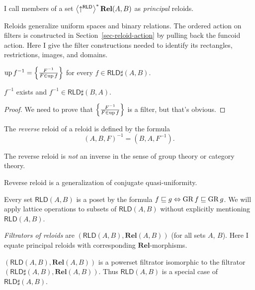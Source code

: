 \begin{defn}
I call members of a set $\left\langle \uparrow^{\mathsf{RLD}}\right\rangle ^{\ast}\mathbf{Rel}(A,B)$
as \emph{principal} reloids.
\end{defn}

Reloids generalize uniform spaces and binary relations. The
ordered action on filters is constructed in
Section~\ref{sec-reloid-action} by pulling back the funcoid action.
Here I give the filter constructions needed to identify its
rectangles, restrictions, images, and domains.

\begin{defn}
$\operatorname{up} f^{-1} = \left\{ \frac{F^{-1}}{F\in\operatorname{up} f}\right\}$ for every $f\in\mathsf{RLD}\sharp(A,B)$.
\end{defn}

\begin{prop}
$f^{-1}$ exists and $f^{-1}\in\mathsf{RLD}\sharp(B,A)$.
\end{prop}

\begin{proof}
We need to prove that $\left\{ \frac{F^{-1}}{F\in\operatorname{up} f}\right\}$ is a filter, but that's obvious.
\end{proof}

\begin{defn}
The \emph{reverse} reloid of a reloid is defined
by the formula
\[
(A,B,F)^{-1}=(B,A,F^{-1}).
\]
\end{defn}
\begin{note}
The reverse reloid is \emph{not} an inverse in the sense of group
theory or category theory.
\end{note}
Reverse reloid is a generalization of conjugate quasi-uniformity.
\begin{defn}
Every set $\mathsf{RLD}(A,B)$ is a poset by the formula $f\sqsubseteq g\Leftrightarrow\operatorname{GR} f\sqsubseteq\operatorname{GR} g$.
We will apply lattice operations to subsets of $\mathsf{RLD}(A,B)$
without explicitly mentioning $\mathsf{RLD}(A,B)$.\end{defn}

\emph{Filtrators of reloids} are $(\mathsf{RLD}(A,B),\mathbf{Rel}(A,B))$
(for all sets $A$, $B$). Here I equate principal reloids with corresponding $\mathbf{Rel}$-morphisms.

\begin{obvious}
$(\mathsf{RLD}(A,B),\mathbf{Rel}(A,B))$ is a powerset filtrator isomorphic to the filtrator
$(\mathsf{RLD}\sharp(A,B),\mathbf{Rel}(A,B))$. Thus $\mathsf{RLD}(A,B)$ is a special case of $\mathsf{RLD}\sharp(A,B)$.
\end{obvious}

